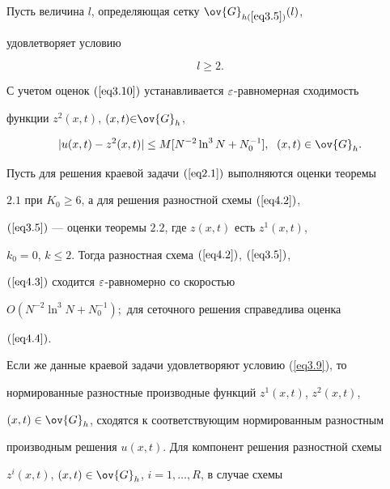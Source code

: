 Пусть величина $l$, определяющая сетку $\ov{G}_{h(\ref{eq3.5})}(l)$,


удовлетворяет условию


\begin{equation}


\label{eq4.3}


l\ge 2.


\end{equation}


С учетом оценок $(\ref{eq3.10})$ устанавливается $\varepsilon$-равномерная сходимость


функции $z^2(x,t)$, $(x,t){\in}\ov{G}_h$,


\begin{equation}


\label{eq4.4}


|u(x,t)-z^2(x,t)|\le M[N^{-2}\ln^3 N+N_0^{-1}],\ \; (x,t)\in\ov{G}_h.


\end{equation}





\begin{lems}


Пусть для решения краевой задачи $(\ref{eq2.1})$ выполняются оценки теоремы


$2.1$ при $K_0\ge 6$, а для решения разностной схемы $(\ref{eq4.2})$,


$(\ref{eq3.5})$ --- оценки теоремы $2.2$, где $z(x,t)$ есть $z^1(x,t)$,


$k_0=0$, $k\le 2$. Тогда разностная схема $(\ref{eq4.2})$, $(\ref{eq3.5})$,


$(\ref{eq4.3})$ сходится $\varepsilon$-равномерно со скоростью


$O(N^{-2}\ln^3N+N_0^{-1});$ для сеточного решения справедлива оценка


$(\ref{eq4.4})$.


\end{lems}





Если же данные краевой задачи удовлетворяют условию (\ref{eq3.9}), то


нормированные разностные производные функций $z^1(x,t)$, $z^2(x,t)$,


$(x,t)\in \ov{G}_h$, сходятся к соответствующим нормированным разностным


производным решения $u(x,t)$.  Для компонент решения разностной схемы


$z^i(x,t)$, $(x,t)\in\ov{G}_h$, $i=1,\dotsc,R$, в случае схемы


